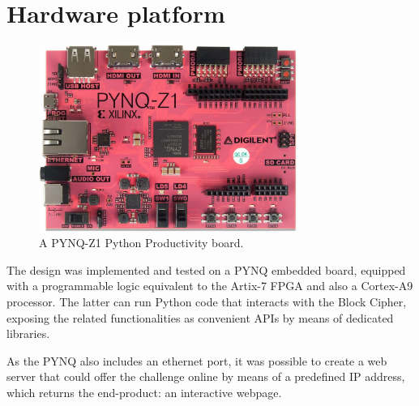 \section{Hardware platform}
\begin{figure}[!ht]
\vspace{0.5cm}
\centering
\includegraphics[width=0.75\textwidth]{images/PYNQ.jpg}
\caption{A PYNQ-Z1 Python Productivity board.}
\end{figure}
The design was implemented and tested on a PYNQ embedded board, equipped with a programmable logic equivalent to the Artix-7 FPGA and also a Cortex-A9 processor.
The latter can run Python code that interacts with the Block Cipher, exposing the related functionalities as convenient APIs by means of dedicated libraries.

As the PYNQ also includes an ethernet port, it was possible to create a web server that could offer the challenge online by means of a predefined IP address, which returns the end-product: an interactive webpage.